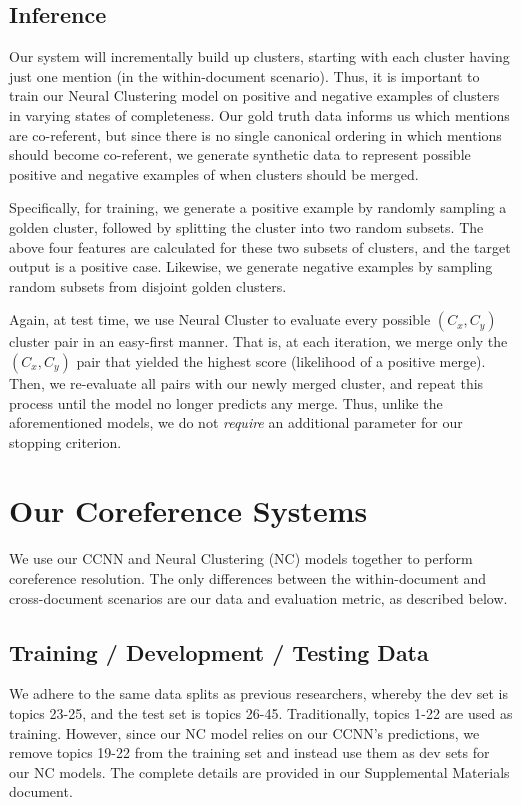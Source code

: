 \documentclass[11pt,a4paper]{article}
\begin{document}
\subsection{Inference}
Our system will incrementally build up clusters, starting with each cluster having just one mention (in the within-document scenario).  Thus, it is important to train our Neural Clustering model on positive and negative examples of clusters in varying states of completeness.  Our gold truth data informs us which mentions are co-referent, but since there is no single canonical ordering in which mentions should become co-referent, we generate synthetic data to represent possible positive and negative examples of when clusters should be merged.

Specifically, for training, we generate a positive example by randomly sampling a golden cluster, followed by splitting the cluster into two random subsets.  The above four features are calculated for these two subsets of clusters, and the target output is a positive case.  Likewise, we generate negative examples by sampling random subsets from disjoint golden clusters.

Again, at test time, we use Neural Cluster to evaluate every possible $(C_x, C_y)$ cluster pair in an easy-first manner.  That is, at each iteration, we merge only the $(C_x,C_y)$ pair that yielded the highest score (likelihood of a positive merge).  Then, we re-evaluate all pairs with our newly merged cluster, and repeat this process until the model no longer predicts any merge.  Thus, unlike the aforementioned models, we do not \textit{require} an additional parameter for our stopping criterion.

\section{Our Coreference Systems}
\label{sec:coreference}

We use our CCNN and Neural Clustering (NC) models together to perform coreference resolution. The only differences between the within-document and cross-document scenarios are our data and evaluation metric, as described below.

\subsection{Training / Development / Testing Data}
We adhere to the same data splits as previous researchers, whereby the dev set is topics 23-25, and the test set is topics 26-45.  Traditionally, topics 1-22 are used as training.  However, since our NC model relies on our CCNN's predictions, we remove topics 19-22 from the training set and instead use them as dev sets for our NC models.  The complete details are provided in our Supplemental Materials document.
\end{document}

